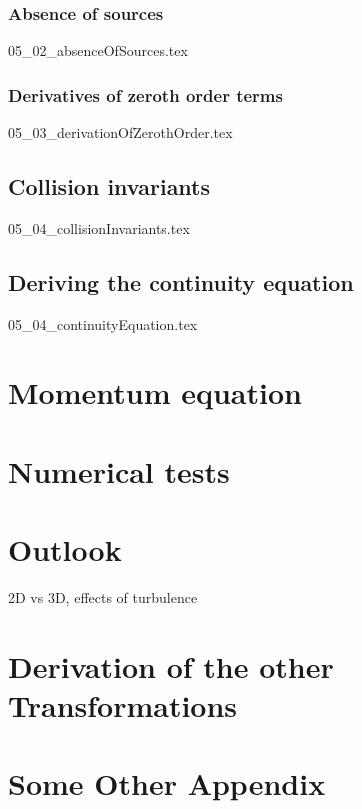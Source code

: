 \documentclass[12pt,a4paper,twoside]{article}
\begin{document}
\subsubsection{Absence of sources}
\label{subs:Absence of sources}
{05_02_absenceOfSources.tex}

\subsubsection{Derivatives of zeroth order terms}
\label{subs:Derivatives of zeroth order terms}
{05_03_derivationOfZerothOrder.tex}

\subsection{Collision invariants}
\label{sub:Collision invariants}
{05_04_collisionInvariants.tex}

\subsection{Deriving the continuity equation}
\label{sub:Deriving the continuity equation}
{05_04_continuityEquation.tex}

\section{Momentum equation}
\label{sec:Momentum equation}

\section{Numerical tests}
\label{sec:Numerics}

\section{Outlook}
\label{sec:Outlook}
2D vs 3D, effects of turbulence

\newpage
\begin{appendices}

\section{Derivation of the other Transformations}
\section{Some Other Appendix}






\end{appendices}
\end{document}
